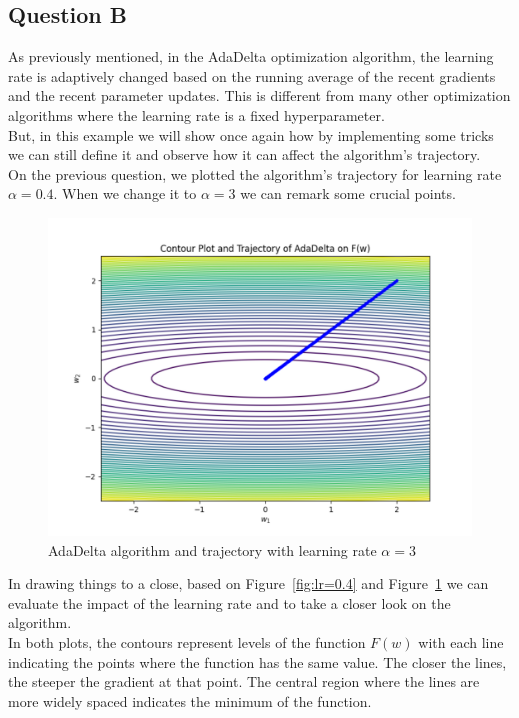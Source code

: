 \subsection{Question B}
As previously mentioned, in the AdaDelta optimization algorithm, the learning rate is adaptively changed based on the running average of the recent gradients and the recent parameter updates. This is different from many other optimization algorithms where the learning rate is a fixed hyperparameter.\\
But, in this example we will show once again how by implementing some tricks we can still define it and observe how it can affect the algorithm's trajectory.\\

On the previous question, we plotted the algorithm's trajectory for learning rate $\alpha=0.4$. When we change it to $\alpha=3$ we can remark some crucial points.
\begin{figure}[H]
	\centering
	\includegraphics[width=.7\textwidth]{../Problem 8/ADADELTA_3.pdf}
	\caption{AdaDelta algorithm and trajectory with learning rate $\alpha=3$}
	\label{fig:lr=3}
\end{figure}
\vspace{2mm}

In drawing things to a close, based on Figure~\ref{fig:lr=0.4} and Figure~\ref{fig:lr=3} we can evaluate the impact of the learning rate and to take a closer look on the algorithm.\\

In both plots, the contours represent levels of the function $F(w)$ with each line indicating the points where the function has the same value. The closer the lines, the steeper the gradient at that point. The central region where the lines are more widely spaced indicates the minimum of the function.\\


